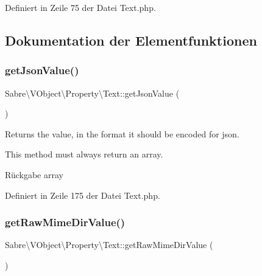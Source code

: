 Definiert in Zeile 75 der Datei Text.\+php.



\subsection{Dokumentation der Elementfunktionen}
\mbox{\label{class_sabre_1_1_v_object_1_1_property_1_1_text_a82f0d49a721cb640b74b82b50c8c531a}} 
\subsubsection{\texorpdfstring{get\+Json\+Value()}{getJsonValue()}}
{\footnotesize\ttfamily Sabre\textbackslash{}\+V\+Object\textbackslash{}\+Property\textbackslash{}\+Text\+::get\+Json\+Value (\begin{DoxyParamCaption}{ }\end{DoxyParamCaption})}

Returns the value, in the format it should be encoded for json.

This method must always return an array.

\begin{DoxyReturn}{Rückgabe}
array 
\end{DoxyReturn}


Definiert in Zeile 175 der Datei Text.\+php.

\mbox{\label{class_sabre_1_1_v_object_1_1_property_1_1_text_a6910923b00244a60bc4a57168e23cf98}} 
\subsubsection{\texorpdfstring{get\+Raw\+Mime\+Dir\+Value()}{getRawMimeDirValue()}}
{\footnotesize\ttfamily Sabre\textbackslash{}\+V\+Object\textbackslash{}\+Property\textbackslash{}\+Text\+::get\+Raw\+Mime\+Dir\+Value (\begin{DoxyParamCaption}{ }\end{DoxyParamCaption})}

